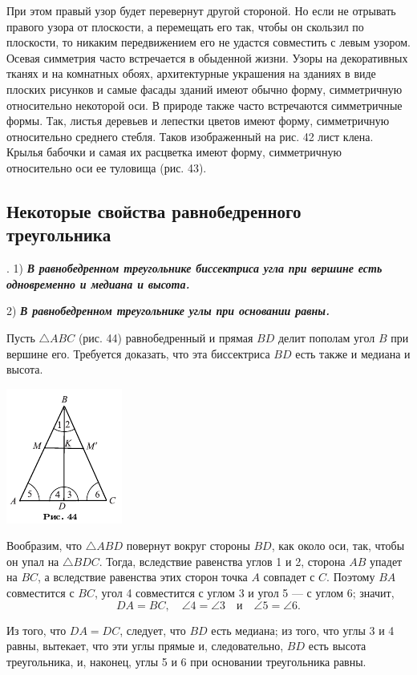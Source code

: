 \documentclass[oneside]{book}
\begin{document}
При этом правый узор будет перевернут другой стороной.
Но если не отрывать правого узора от плоскости, а перемещать его так, чтобы он скользил по плоскости, то никаким передвижением его не удастся совместить с левым узором.
Осевая симметрия часто встречается в обыденной жизни.
Узоры на декоративных тканях и на комнатных обоях, архитектурные украшения на зданиях в виде плоских рисунков и самые фасады зданий имеют обычно форму, симметричную относительно некоторой оси.
В природе также часто встречаются симметричные формы.
Так, листья деревьев и лепестки цветов имеют форму, симметричную относительно среднего стебля.
Таков изображенный на рис. 42 лист клена.
Крылья бабочки и самая их расцветка имеют форму, симметричную относительно оси ее туловища (рис. 43).

\subsection*{Некоторые свойства равнобедренного треугольника}

.
1) \textbf{\emph{В равнобедренном треугольнике биссектриса угла при вершине есть одновременно и медиана и высота.}}

2) \textbf{\emph{В равнобедренном треугольнике углы при основании равны.}}

Пусть $\triangle ABC$ (рис. 44) равнобедренный и прямая $BD$ делит пополам угол $B$ при вершине его.
Требуется доказать, что эта биссектриса $BD$ есть также и медиана и высота.

\includegraphics{pics/ris-44}

Вообразим, что $\triangle ABD$ повернут вокруг стороны $BD$, как около оси, так, чтобы он упал на $\triangle BDC$.
Тогда, вследствие равенства углов 1 и 2, сторона $AB$ упадет на $BC$, а вследствие равенства этих сторон точка $A$ совпадет с $C$.
Поэтому $BA$ совместится с $BC$, угол 4 совместится с углом 3 и угол 5 — с углом 6;
значит,
\[DA = BC,\quad \angle 4 = \angle 3\quad \text{и}\quad \angle 5 = \angle 6.\]

Из того, что $DA=DC$, следует, что $BD$ есть медиана;
из того, что углы 3 и 4 равны, вытекает, что эти углы прямые и, следовательно, $BD$ есть высота треугольника, и, наконец, углы 5 и 6 при основании треугольника равны.
\end{document}
